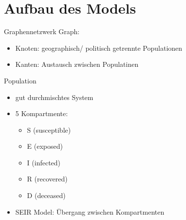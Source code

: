 
    \begin{frame}
        \maketitle
    \end{frame}
    
    \section{Aufbau des Models}
    
    \begin{frame}{Graphennetzwerk}
        Graph:
        \begin{itemize}
            \item Knoten: geographisch/ politisch getrennte Populationen
            \item Kanten: Austausch zwischen Populatinen
        \end{itemize}
    \end{frame}
    

    \begin{frame}{Population}

         
        \begin{itemize}
            \item gut durchmischtes System 
            \item 5 Kompartmente: 
                \begin{itemize}
                    \item S (susceptible)
                    \item E (exposed)
                    \item I (infected)
                    \item R (recovered)
                    \item D (deceased)
                \end{itemize}  
            \item SEIR Model: Übergang zwischen Kompartmenten
        \end{itemize}

    \end{frame}

